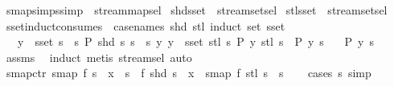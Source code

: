\begin{isabellebody}
%
\endisadelimproof
\isanewline
{}\isamarkupfalse%
\isanewline
\isanewline
{}\isamarkupfalse%
\ smap{\isacharunderscore}simps{\isacharbrackleft}simp{\isacharbrackright}\ {\isacharequal}\ stream{\isachardot}map{\isacharunderscore}sel\isanewline
{}\isamarkupfalse%
\ shd{\isacharunderscore}sset\ {\isacharequal}\ stream{\isachardot}set{\isacharunderscore}sel{\isacharparenleft}{}{\isacharparenright}\isanewline
{}\isamarkupfalse%
\ stl{\isacharunderscore}sset\ {\isacharequal}\ stream{\isachardot}set{\isacharunderscore}sel{\isacharparenleft}{}{\isacharparenright}\isanewline
\isanewline
{}\isamarkupfalse%
\ sset{\isacharunderscore}induct{\isacharbrackleft}consumes\ {}{\isacharcomma}\ case{\isacharunderscore}names\ shd\ stl{\isacharcomma}\ induct\ set{\isacharcolon}\ sset{\isacharbrackright}{\isacharcolon}\isanewline
\ \ \ {\isachardoublequoteopen}y\ {\isasymin}\ sset\ s{\isachardoublequoteclose}\ \ {\isachardoublequoteopen}{\isasymAnd}s{\isachardot}\ P\ {\isacharparenleft}shd\ s{\isacharparenright}\ s{\isachardoublequoteclose}\ \ {\isachardoublequoteopen}{\isasymAnd}s\ y{\isachardot}\ {\isasymlbrakk}y\ {\isasymin}\ sset\ {\isacharparenleft}stl\ s{\isacharparenright}{\isacharsemicolon}\ P\ y\ {\isacharparenleft}stl\ s{\isacharparenright}{\isasymrbrakk}\ {\isasymLongrightarrow}\ P\ y\ s{\isachardoublequoteclose}\isanewline
\ \ \ {\isachardoublequoteopen}P\ y\ s{\isachardoublequoteclose}\isanewline
%
\isadelimproof
%
\endisadelimproof
%
\isatagproof
{}\isamarkupfalse%
\ assms\ \isamarkupfalse%
\ induct\ {\isacharparenleft}metis\ stream{\isachardot}sel{\isacharparenleft}{}{\isacharparenright}{\isacharcomma}\ auto{\isacharparenright}%
\endisatagproof
{\isafoldproof}%
%
\isadelimproof
\isanewline
%
\endisadelimproof
\isanewline
{}\isamarkupfalse%
\ smap{\isacharunderscore}ctr{\isacharcolon}\ {\isachardoublequoteopen}smap\ f\ s\ {\isacharequal}\ x\ {\isacharhash}{\isacharhash}\ s{\isacharprime}\ {\isasymlongleftrightarrow}\ f\ {\isacharparenleft}shd\ s{\isacharparenright}\ {\isacharequal}\ x\ {\isasymand}\ smap\ f\ {\isacharparenleft}stl\ s{\isacharparenright}\ {\isacharequal}\ s{\isacharprime}{\isachardoublequoteclose}\isanewline
%
\isadelimproof
\ \ %
\endisadelimproof
%
\isatagproof
{}\isamarkupfalse%
\ {\isacharparenleft}cases\ s{\isacharparenright}\ simp%
\endisatagproof
{\isafoldproof}%
%
\isadelimproof
%
\endisadelimproof

\end{isabellebody}
